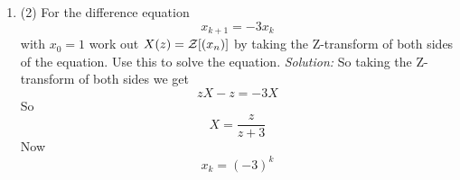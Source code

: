 \documentclass[12pt]{article}
\newcommand\soln{\noindent\textit{Solution:} }
\begin{document}
{\begin{enumerate}
\item (2) For the difference equation
\begin{equation}
x_{k+1}=-3x_k
\end{equation}
with $x_0=1$ work out $X(z)={\cal Z}[(x_n)]$ by taking the Z-transform of both sides of the equation. Use this to solve the equation.
\vskip 1cm
\soln So taking the Z-transform of both sides we get
\begin{equation}
zX-z=-3X
\end{equation}
So 
\begin{equation}
X=\frac{z}{z+3}
\end{equation}
Now
\begin{equation}
x_k=(-3)^k
\end{equation}
\end{enumerate}
}
\end{document}
